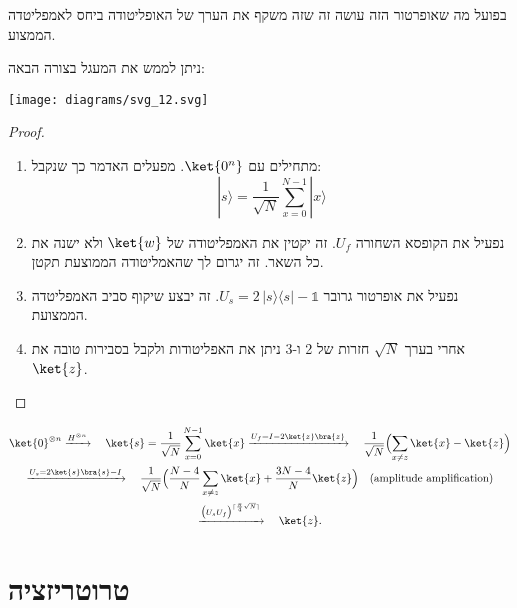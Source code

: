 \documentclass{tstextbook}
\begin{document}
\begin{remark}
בפועל מה שאופרטור הזה עושה זה שזה משקף את הערך של האופליטודה ביחס לאמפליטדה הממצוע.

\end{remark}
\begin{proposition}
ניתן לממש את המעגל בצורה הבאה:

\texttt{[image: diagrams/svg\_12.svg]}
\end{proposition}
\begin{proof}
  \begin{enumerate}
    \item מתחילים עם \(\ket{0^{n}}\). מפעלים האדמר כך שנקבל: 
$$|s\rangle={\frac{1}{\sqrt{N}}}\sum_{x=0}^{N-1}|x\rangle$$


    \item נפעיל את הקופסא השחורה \(U_{f}\). זה יקטין את האמפליטודה של \(\ket{w}\) ולא ישנה את כל השאר. זה יגרום לך שהאמליטודה הממוצעת תקטן. 


    \item נפעיל את אופרטור גרובר \(U_{s}=2\,|s\rangle\!\langle s|-\mathbb{1}\). זה יבצע שיקוף סביב האמפליטדה הממצועת.  


    \item אחרי בערך \(\sqrt{ N }\) חזרות של 2 ו-3 ניתן את האפליטודות ולקבל בסבירות טובה את \(\ket{z}\). 


  \end{enumerate}
\end{proof}
\begin{summary}
$$\begin{gather*}\ket{0}^{\otimes n} \xrightarrow{H^{\otimes n}} \quad \ket{s} = \frac{1}{\sqrt{N}}\sum_{x=0}^{N-1}\ket{x} \xrightarrow{U_f = I-2\ket{z}\bra{z}} \quad \frac{1}{\sqrt{N}}\Bigl(\sum_{x\neq z}\ket{x} - \ket{z}\Bigr) \\\xrightarrow{U_s = 2\ket{s}\bra{s}-I} \quad \frac{1}{\sqrt{N}}\Bigl(\frac{N-4}{N}\sum_{x\neq z}\ket{x} + \frac{3N-4}{N}\ket{z}\Bigr) \quad \text{(amplitude amplification)} \\\xrightarrow{\bigl(U_sU_f\bigr)^{\lceil \frac{\pi}{4}\sqrt{N}\rceil}} \quad \ket{z}.
\end{gather*}$$

\end{summary}

\section{טרוטריזציה}
\end{document}
